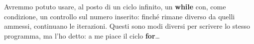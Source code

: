 	
	Avremmo potuto usare, al posto di un ciclo infinito, un \textbf{while} con, come condizione, un controllo sul numero inserito: finché rimane diverso da quelli ammessi, continuano le iterazioni. Questi sono modi diversi per scrivere lo stesso programma, ma l'ho detto: a me piace il ciclo \textbf{for}\ldots

